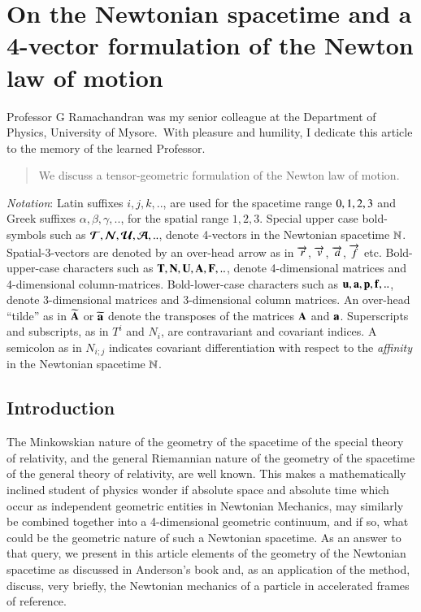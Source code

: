 \chapter[On the Newtonian spacetime and a 4-vector formulation...]{On the Newtonian spacetime and a 4-vector formulation of the Newton law of motion}\label{chap16}



\noindent
Professor G Ramachandran was my senior colleague at the Department of Physics, University of Mysore.~With pleasure and humility, I dedicate this article to the memory of the learned Professor.

\begin{abstract} 
We discuss a tensor-geometric formulation of the Newton law of motion.
\end{abstract}

\noindent
\textsl{Notation}: Latin suffixes  $i,j,k,..$, are used for the spacetime range $0,1,\break 2,3$ and Greek suffixes  $\alpha, \beta, \gamma, ..$, for the spatial  range $1,2,3$. Special upper case bold-symbols such as $\bm{\mathcal{T}}, \bm{\mathcal{N}}, \bm{\mathcal{U}},\bm{\mathcal{A}},..$,  denote 4-vectors in the Newtonian spacetime $\mathbb{N}$.  Spatial-3-vectors are denoted by an over-head arrow as in $\overrightarrow{r}$,  $\overrightarrow{v}$,  $\overrightarrow{a}$, $\overrightarrow{f}$ etc. Bold-upper-case characters such as $\mathbf{T,N,U,A,F},..$, denote 4-dimensional matrices and 4-dimensional column-matrices. Bold-lower-case characters such as $\mathbf{u,a,p,f},..$, denote 3-dimensional matrices and 3-dimensional column matrices.  An over-head ``tilde'' as in $\widetilde{\mathbf{A}}$ or  $\widetilde{\mathbf{a}}$ denote the transposes of the matrices  $\mathbf{A}$ and $\mathbf{a}$. Superscripts and subscripts, as in  $T^i$ and  $N_i$, are contravariant and covariant indices. A semicolon as in $N_{i;j}$ indicates  covariant differentiation with respect to the \textsl{affinity} in the Newtonian spacetime $\mathbb{N}$.

\section{Introduction}\label{chap16-sec1}

The Minkowskian nature of the geometry of the spacetime of the special theory of relativity, and the general Riemannian nature of the geometry of the spacetime of the general theory of relativity, are well known. This makes a mathematically inclined student of physics  wonder if absolute space and absolute time which occur as independent geometric entities in Newtonian Mechanics, may similarly be combined together into a 4-dimensional geometric continuum, and if so, what could be the geometric nature of such a  Newtonian spacetime. As an  answer to that query, we present in this article elements of the geometry of the Newtonian spacetime as discussed in Anderson's book \cite{chap16-key1} and, as an application of the method, discuss, very briefly, the Newtonian mechanics of a particle in accelerated frames of reference.

